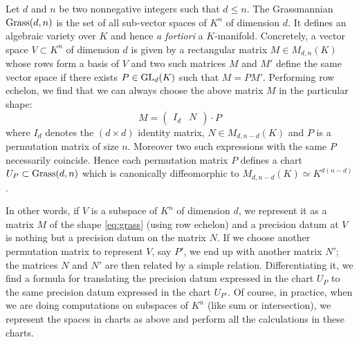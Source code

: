\documentclass{lms}
\begin{document}
Let $d$ and $n$ be two nonnegative integers such that $d \leq n$. The 
Grassmannian $\text{\rm Grass}(d,n)$ is the set of all sub-vector spaces of $K^n$ 
of dimension $d$. It defines an algebraic variety over $K$ and hence
\emph{a fortiori} a $K$-manifold.
Concretely, a vector space $V \subset K^n$ of dimension $d$ is given by 
a rectangular matrix $M \in M_{d,n}(K)$ whose rows form a basis of $V$ 
and two such matrices $M$ and $M'$ define the same vector space if there 
exists $P \in \text{\rm GL}_d(K)$ such that $M = P M'$. Performing row echelon, we 
find that we can always choose the above matrix $M$ in the particular
shape:
\begin{equation}
\label{eq:grass}
M = \begin{pmatrix} I_d & N \end{pmatrix} \cdot P
\end{equation}
where $I_d$ denotes the $(d \times d)$ identity matrix, $N \in M_{d, 
n-d}(K)$ and $P$ is a permutation matrix of size $n$. Moreover two 
such expressions with the same $P$ necessarily coincide. Hence each 
permutation matrix $P$ defines a chart $U_P \subset \text{\rm Grass}(d,n)$ which
is canonically diffeomorphic to $M_{d, n-d}(K) \simeq K^{d(n-d)}$.

In other words, if $V$ is a subspace of $K^n$ of dimension $d$, we 
represent it as a matrix $M$ of the shape \eqref{eq:grass} (using row 
echelon) and a precision datum at $V$ is nothing but a precision datum on 
the matrix $N$. If we choose another permutation matrix to represent $V$, 
say $P'$, we end up with another matrix $N'$; the matrices $N$ and $N'$ 
are then related by a simple relation. Differentiating it, we find a 
formula for translating the precision datum expressed in the chart $U_P$ 
to the same precision datum expressed in the chart $U_{P'}$.
Of course, in practice, when we are doing computations on subspaces of
$K^n$ (like sum or intersection), we represent the spaces in charts as
above and perform all the calculations in these charts.

%
\end{document}

